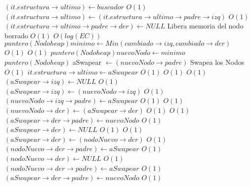 \begin{Algoritmos}
\begin{algorithmic}[1]
						\State $(it.estructura \rightarrow ultimo) \gets buscador$ \Comment $O(1)$
					\EndIf
				\Else
					\State $(it.estructura \rightarrow ultimo) \gets (it.estructura \rightarrow ultimo \rightarrow padre \rightarrow izq)$ \Comment $O(1)$
					\State $(it.estructura \rightarrow ultimo \rightarrow padre \rightarrow der) \gets NULL$ \Comment Libera memoria del nodo borrado $O(1)$
				\EndIf				
				 \Comment $O(log(EC))$
					\State $puntero(Nodoheap) minimo \gets Min(cambiado \rightarrow izq, cambiado \rightarrow der)$ \Comment $O(1)$
					 \Comment $O(1)$
					\State $puntero(Nodoheap) nuevoNodo \gets minimo$					
					\State $puntero(Nodoheap)$ aSwapear $\gets (nuevoNodo \rightarrow padre)$
    		 \Comment Swapea los Nodos $O(1)$
    			\State $it.estructura \rightarrow ultimo \gets aSwapear$ \Comment $O(1)$
    		\EndIf
			 \Comment $O(1)$
						 \Comment $O(1)$
								\State $(aSwapear \rightarrow izq) \gets NULL$ \Comment $O(1)$
							\Else
								\State $(aSwapear \rightarrow izq) \gets (nuevoNodo \rightarrow izq)$ \Comment $O(1)$
								\State $(nuevoNodo \rightarrow izq \rightarrow padre) \gets aSwapear$ \Comment $O(1)$
							\EndIf
							 \Comment $O(1)$
								\State $(nuevoNodo \rightarrow der) \gets (aSwapear \rightarrow der)$ \Comment $O(1)$
								 \Comment $O(1)$
								\State $(aSwapear \rightarrow der \rightarrow padre) \gets nuevoNodo$	 \Comment $O(1)$						
								\EndIf
								\State $(aSwapear \rightarrow der) \gets NULL$ \Comment $O(1)$
							\Else
								 \Comment $O(1)$
									\State $(aSwapear \rightarrow der) \gets (nodoNuevo \rightarrow der)$ \Comment $O(1)$
									\State $(nodoNuevo \rightarrow der \rightarrow padre) \gets aSwapear$ \Comment $O(1)$
									\State $(nodoNuevo \rightarrow der) \gets NULL$ \Comment $O(1)$
								\Else
									\State $(nodoNuevo \rightarrow der \rightarrow padre) \gets aSwapear$ \Comment $O(1)$
									\State $(aSwapear \rightarrow der \rightarrow padre) \gets nuevoNodo$ \Comment $O(1)$

\end{algorithmic}
\end{Algoritmos}
